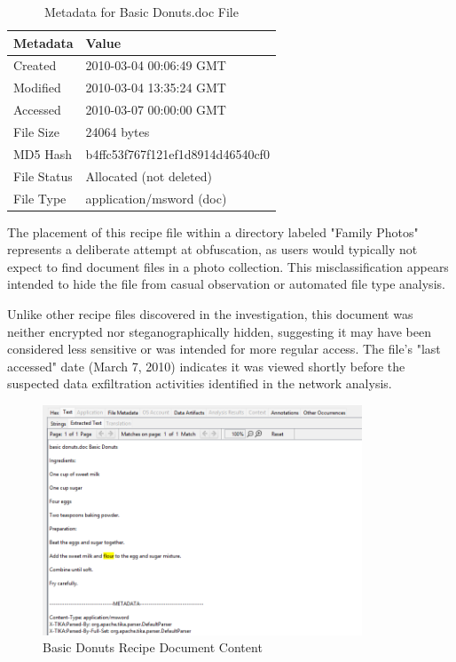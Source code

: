 \begin{table}[htbp]
\centering
\begin{tabular}{|p{3cm}|p{7cm}|}
\hline
\textbf{Metadata} & \textbf{Value} \\
\hline
Created & 2010-03-04 00:06:49 GMT \\
\hline
Modified & 2010-03-04 13:35:24 GMT \\
\hline
Accessed & 2010-03-07 00:00:00 GMT \\
\hline
File Size & 24064 bytes \\
\hline
MD5 Hash & b4ffc53f767f121ef1d8914d46540cf0 \\
\hline
File Status & Allocated (not deleted) \\
\hline
File Type & application/msword (doc) \\
\hline
\end{tabular}
\caption{Metadata for Basic Donuts.doc File}
\label{table:basic_donuts_metadata}
\end{table}

The placement of this recipe file within a directory labeled "Family Photos" represents a deliberate attempt at obfuscation, as users would typically not expect to find document files in a photo collection. This misclassification appears intended to hide the file from casual observation or automated file type analysis.

Unlike other recipe files discovered in the investigation, this document was neither encrypted nor steganographically hidden, suggesting it may have been considered less sensitive or was intended for more regular access. The file's "last accessed" date (March 7, 2010) indicates it was viewed shortly before the suspected data exfiltration activities identified in the network analysis.

\begin{figure}[h]
    \centering
    \includegraphics[width=0.85\textwidth]{images/Artifact and Evidence Recovery/BasicDonuts.png}
    \caption{Basic Donuts Recipe Document Content}
    \label{fig:basic_donuts}
\end{figure}


